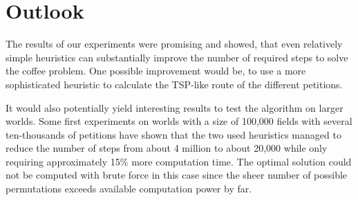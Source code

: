\section{Outlook}

The results of our experiments were promising and showed, that even relatively simple heuristics can substantially improve the number of required steps to solve the coffee problem. One possible improvement would be, to use a more sophisticated heuristic to calculate the TSP-like route of the different petitions. 

It would also potentially yield interesting results to test the algorithm on larger worlds. Some first experiments on worlds with a size of 100,000 fields with several ten-thousands of petitions have shown that the two used heuristics managed to reduce the number of steps from about 4 million to about 20,000 while only requiring approximately 15\% more computation time. The optimal solution could not be computed with brute force in this case since the sheer number of possible permutations exceeds available computation power by far.
